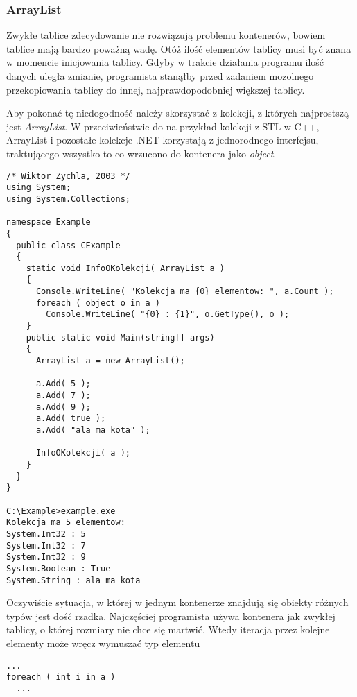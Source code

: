 \subsubsection{{\bf ArrayList}}

Zwykłe tablice zdecydowanie nie rozwiązują problemu kontenerów, bowiem tablice mają bardzo poważną wadę.
Otóż ilość elementów tablicy musi być znana w momencie inicjowania tablicy. Gdyby w trakcie działania programu
ilość danych uległa zmianie, programista stanąłby przed zadaniem mozolnego przekopiowania tablicy do innej,
najprawdopodobniej większej tablicy.

Aby pokonać tę niedogodność należy skorzystać z kolekcji, z których najprostszą jest {\em ArrayList}.
W przeciwieństwie do na przykład kolekcji z STL w C++, ArrayList i pozostałe kolekcje .NET korzystają
z jednorodnego interfejsu, traktującego wszystko to co wrzucono do kontenera jako {\em object}.

\begin{scriptsize}
\begin{verbatim}
/* Wiktor Zychla, 2003 */
using System;
using System.Collections;

namespace Example
{
  public class CExample 
  {
    static void InfoOKolekcji( ArrayList a )
    {
      Console.WriteLine( "Kolekcja ma {0} elementow: ", a.Count );
      foreach ( object o in a )
        Console.WriteLine( "{0} : {1}", o.GetType(), o );
    }
    public static void Main(string[] args)
    {
      ArrayList a = new ArrayList();
      
      a.Add( 5 );
      a.Add( 7 );
      a.Add( 9 );
      a.Add( true );
      a.Add( "ala ma kota" );
      
      InfoOKolekcji( a );
    }
  }
}

C:\Example>example.exe
Kolekcja ma 5 elementow:
System.Int32 : 5
System.Int32 : 7
System.Int32 : 9
System.Boolean : True
System.String : ala ma kota
\end{verbatim}
\end{scriptsize}

Oczywiście sytuacja, w której w jednym kontenerze znajdują się obiekty różnych typów jest dość rzadka.
Najczęściej programista używa kontenera jak zwykłej tablicy, o której rozmiary nie chce się martwić. 
Wtedy iteracja przez kolejne elementy może wręcz wymuszać typ elementu

\begin{scriptsize}
\begin{verbatim}
...
foreach ( int i in a )
  ...
\end{verbatim}
\end{scriptsize}

